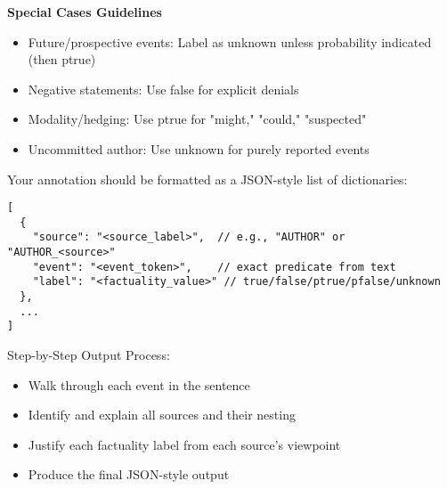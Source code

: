 \begin{figure*}[!ht]
\begin{tcolorbox}[
    width=\textwidth,
    colback=white,
    colframe=black,
    arc=4mm,
    boxrule=0.5pt,
    left=2mm,
    right=2mm,
    top=2mm,
    bottom=2mm,
    fonttitle=\bfseries,
    ]
\begin{tcolorbox}[
    colback=Periwinkle!20,
    boxrule=0pt,
    colframe=white,
    left=0pt,
    right=0pt,
    top=0pt,
    bottom=0pt,
    ]
\textbf{Special Cases Guidelines}
\begin{itemize}[noitemsep, leftmargin=15pt, topsep=0pt]
    \item Future/prospective events: Label as unknown unless probability indicated (then ptrue)
    \item Negative statements: Use false for explicit denials
    \item Modality/hedging: Use ptrue for "might," "could," "suspected"
    \item Uncommitted author: Use unknown for purely reported events
\end{itemize}

\end{tcolorbox}

\begin{tcolorbox}[
    colback=SkyBlue!10,
    boxrule=0pt,
    colframe=white,
    left=0pt,
    right=0pt,
    top=0pt,
    bottom=0pt,
    ]

\small
Your annotation should be formatted as a JSON-style list of dictionaries:

\begin{verbatim}
[
  {
    "source": "<source_label>",  // e.g., "AUTHOR" or "AUTHOR_<source>"
    "event": "<event_token>",    // exact predicate from text
    "label": "<factuality_value>" // true/false/ptrue/pfalse/unknown
  },
  ...
]
\end{verbatim}

Step-by-Step Output Process:
\begin{itemize}[noitemsep, leftmargin=15pt, topsep=0pt]
    \item Walk through each event in the sentence
    \item Identify and explain all sources and their nesting
    \item Justify each factuality label from each source's viewpoint
    \item Produce the final JSON-style output
\end{itemize}

\end{tcolorbox}




\end{tcolorbox}
\label{fig:zero-shot-prompt}
\end{figure*}
